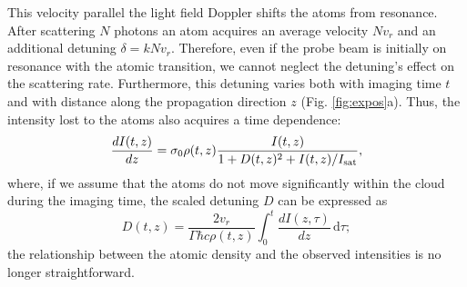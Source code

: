 \documentclass[12pt]{iopart}
\begin{document}
\par This velocity parallel the light field Doppler shifts the atoms from resonance. After scattering $N$ photons an atom acquires an average velocity $N v_r$ and an additional detuning $\delta=k N v_r$. Therefore, even if the probe beam is initially on resonance with the atomic transition, we cannot neglect the detuning's  effect on the scattering rate. Furthermore, this detuning varies both with imaging time $t$ and with distance along the propagation direction $z$ (Fig. \ref{fig:expos}a). Thus, the intensity lost to the atoms also acquires a time dependence: 
\begin{equation}
\frac{dI(t,z)}{dz}=\sigma_0 \rho(t,z) \frac{I(t,z)}{1+D(t,z)^2 +I(t,z)/I_{\rm{sat}}}, \label{eq3}
\end{equation}
where, if we assume that the atoms do not move significantly within the cloud during the imaging time, the scaled detuning $D$ can be expressed as
\begin{equation}
D(t,z)=\frac{2 v_r}{\Gamma\hbar c \rho(t,z)}\int_0^t \frac{dI(z,\tau)}{dz}\,\mathrm{d}\tau; \label{eq4} 
\end{equation}
the relationship between the atomic density and the observed intensities is no longer straightforward.
\end{document}
